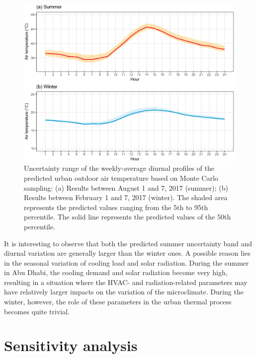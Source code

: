 \begin{figure}[]
\centering
\includegraphics[width=.85\linewidth]{Figure5-1.eps}
\caption{Uncertainty range of the weekly-average diurnal profiles of the predicted urban outdoor air temperature based on Monte Carlo sampling: (a) Results between August 1 and 7, 2017 (summer); (b) Results between February 1 and 7, 2017 (winter). The shaded area represents the predicted values ranging from the 5th to 95th percentile. The solid line represents the predicted values of the 50th percentile.}
\end{figure}

It is interesting to observe that both the predicted summer uncertainty band and diurnal variation are generally larger than the winter ones. A possible reason lies in the seasonal variation of cooling load and solar radiation. During the summer in Abu Dhabi, the cooling demand and solar radiation become very high, resulting in a situation where the HVAC- and radiation-related parameters may have relatively larger impacts on the variation of the microclimate. During the winter, however, the role of these parameters in the urban thermal process becomes quite trivial.

\section{Sensitivity analysis}

